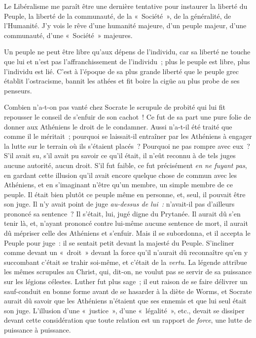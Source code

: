 \documentclass[french,twoside]{book} %
\begin{document}
Le Libéralisme me paraît être une dernière tentative pour instaurer la liberté du Peuple, la liberté de la communauté, de la « Société », de la généralité, de l’Humanité. J’y vois le rêve d’une humanité majeure, d’un peuple majeur, d’une communauté, d’une « Société » majeures.\par
Un peuple ne peut être libre qu’aux dépens de l’individu, car sa liberté ne touche que lui et n’est pas l’affranchissement de l’individu ; plus le peuple est libre, plus l’individu est lié. C’est à l’époque de sa plus grande liberté que le peuple grec établit l’ostracisme, bannit les athées et fit boire la cigüe au plus probe de ses penseurs.\par
Combien n’a-t-on pas vanté chez Socrate le scrupule de probité qui lui fit repousser le conseil de s’enfuir de son cachot ! Ce fut de sa part une pure folie de donner aux Athéniens le droit de le condamner. Aussi n’a-t-il été traité que comme il le méritait ; pourquoi se laissait-il entraîner par les Athéniens à engager la lutte sur le terrain où ils s’étaient placés ? Pourquoi ne pas rompre avec eux ? S’il avait su, s’il avait pu savoir ce qu’il était, il n’eût reconnu à de tels juges aucune autorité, aucun droit. S’il fut faible, ce fut précisément \emph{en ne fuyant pas}, en gardant cette illusion qu’il avait encore quelque chose de commun avec les Athéniens, et en s’imaginant n’être qu’un membre, un simple membre de ce peuple. Il était bien  plutôt ce peuple même en personne, et, seul, il pouvait être son juge. Il n’y avait point de juge \emph{au-dessus de lui :} n’avait-il pas d’ailleurs prononcé sa sentence ? Il s’était, lui, jugé digne du Prytanée. Il aurait dû s’en tenir là, et, n’ayant prononcé contre lui-même aucune sentence de mort, il aurait dû mépriser celle des Athéniens et s’enfuir. Mais il se subordonna, et il accepta le Peuple pour juge : il se sentait petit devant la majesté du Peuple. S’incliner comme devant un « droit » devant la force qu’il n’aurait dû reconnaître qu’en y succombant c’était se trahir soi-même, et c’était de la \emph{vertu}. La légende attribue les mêmes scrupules au Christ, qui, dit-on, ne voulut pas se servir de sa puissance sur les légions célestes. Luther fut plus sage ; il eut raison de se faire délivrer un sauf-conduit en bonne forme avant de se hasarder à la diète de Worms, et Socrate aurait dû savoir que les Athéniens n’étaient que ses ennemis et que lui seul était son juge. L’illusion d’une « justice », d’une « légalité », etc., devait se dissiper devant cette considération que toute relation est un rapport de \emph{force}, une lutte de puissance à puissance.\par
\end{document}
